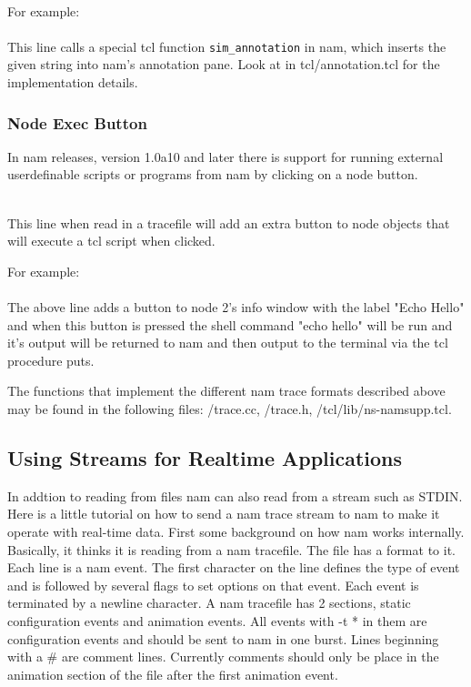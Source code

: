 \\

For example:\\
\\

This line calls a special tcl function {\tt sim\_annotation} in
nam, which inserts the given string 
into nam's annotation pane.  Look at  
 in 
tcl/annotation.tcl for the implementation details.

\subsubsection{Node Exec Button}
In nam releases, version 1.0a10 and later there is support for running external
userdefinable scripts or programs from nam by clicking on a node button.

\\

This line when read in a tracefile will add an extra button to node objects that
will execute a tcl script when clicked.

For example:\\
\\

The above line adds a button to node 2's info window with the label 
"Echo Hello" and when this button is pressed the shell command 
"echo hello" will be run and it's output will be returned to nam and
then output to the terminal via the tcl procedure puts.


The functions that implement the different nam trace formats described
above may be found in the following files: \ns/trace.cc, 
\ns/trace.h, \ns/tcl/lib/ns-namsupp.tcl.


\subsection{Using Streams for Realtime Applications}

In addtion to reading from files nam can also read from a stream such as
STDIN. Here is a little tutorial on how to send a nam trace stream to nam to
make it operate with real-time data.  First some
background on how nam works internally.  Basically, it thinks it is
reading from a nam tracefile.  The file has a format to it.  Each line
is a nam event.  The first character on the line defines the type of
event and is followed by several flags to set options on that event.
Each event is terminated by a newline character.  A nam tracefile has 2
sections, static configuration events and animation events.  All events
with -t * in them are configuration events and should be sent to nam in
one burst.  Lines beginning with a \# are comment lines.  Currently
comments should only be place in the animation section of the file after
the first animation event.

